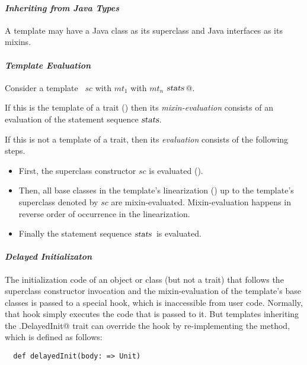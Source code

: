

\paragraph{\em Inheriting from Java Types} A template may have a Java class as
its superclass and Java interfaces as its mixins. 

\paragraph{\em Template Evaluation}
Consider a template ~\lstinline@$sc$ with $mt_1$ with $mt_n$ {$\mbox{\sl stats}\,$}@.

If this is the template of a trait () then its {\em
mixin-evaluation} consists of an evaluation of the statement sequence
$\mbox{\sl stats}$.

If this is not a template of a trait, then its {\em evaluation}
consists of the following steps.
\begin{itemize}
\item
First, the superclass constructor $sc$ is evaluated ().
\item
Then, all base classes in the template's linearization
() up to the
template's superclass denoted by $sc$ are
mixin-evaluated. Mixin-evaluation happens in reverse order of
occurrence in the linearization.
\item 
Finally the statement sequence $\mbox{\sl stats}\,$ is evaluated.
\end{itemize}

\paragraph{\em Delayed Initializaton}
The initialization code of an object or class (but not a trait) that follows the superclass
constructor invocation and the mixin-evaluation of the template's base
classes is passed to a special hook, which is inaccessible from user
code. Normally, that hook simply executes the code that is passed to
it. But templates inheriting the \lstinline@scala.DelayedInit@ trait
can override the hook by re-implementing the \lstinline@delayedInit@
method, which is defined as follows:

\begin{lstlisting}
  def delayedInit(body: => Unit)
\end{lstlisting}


